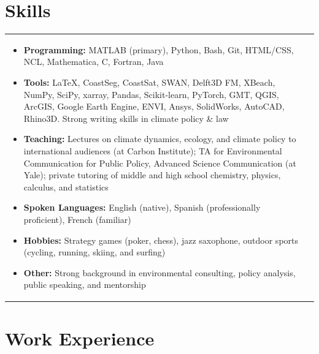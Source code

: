 \documentclass[a4paper,10pt]{article}
\begin{document}
\section{Skills}
\begin{tabularx}{\linewidth}{@{}l X@{}}
\begin{minipage}[t]{\linewidth}
    \begin{itemize}[nosep,after=\strut, leftmargin=1em, itemsep=3pt]
        \item[--] \textbf{Programming:} MATLAB (primary), Python, Bash, Git, HTML/CSS, NCL, Mathematica, C, Fortran, Java
        \item[--] \textbf{Tools:} \LaTeX, CoastSeg, CoastSat, SWAN, Delft3D FM, XBeach, NumPy, SciPy, xarray, Pandas, Scikit-learn, PyTorch, GMT, QGIS, ArcGIS, Google Earth Engine, ENVI, Ansys, SolidWorks, AutoCAD, Rhino3D. Strong writing skills in climate policy \& law
        \item[--] \textbf{Teaching:} Lectures on climate dynamics, ecology, and climate policy to international audiences (at Carbon Institute); TA for Environmental Communication for Public Policy, Advanced Science Communication (at Yale); private tutoring of middle and high school chemistry, physics, calculus, and statistics
        \item[--] \textbf{Spoken Languages:} English (native), Spanish (professionally proficient), French (familiar)
        \item[--] \textbf{Hobbies:} Strategy games (poker, chess), jazz saxophone, outdoor sports (cycling, running, skiing, and surfing)
        \item[--] \textbf{Other:} Strong background in environmental consulting, policy analysis, public speaking, and mentorship
    \end{itemize}
    \end{minipage}
\end{tabularx}

\section{Work Experience}
\end{document}
